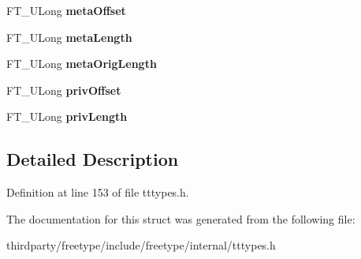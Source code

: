 \begin{DoxyCompactItemize}
\item 
\mbox{\label{struct_w_o_f_f___header_rec___ac93e010ba26ba188d948009c089a824d}} 
F\+T\+\_\+\+U\+Long {\bfseries meta\+Offset}
\item 
\mbox{\label{struct_w_o_f_f___header_rec___a5496776da0752cb2ff133c5068ceb0ab}} 
F\+T\+\_\+\+U\+Long {\bfseries meta\+Length}
\item 
\mbox{\label{struct_w_o_f_f___header_rec___a71ba111d9a0b7139db466f69dc47647f}} 
F\+T\+\_\+\+U\+Long {\bfseries meta\+Orig\+Length}
\item 
\mbox{\label{struct_w_o_f_f___header_rec___a28e0df8dd3d47a13bae3c339c438a0d8}} 
F\+T\+\_\+\+U\+Long {\bfseries priv\+Offset}
\item 
\mbox{\label{struct_w_o_f_f___header_rec___a5b2043f2356a61f1e41cfcd564ca5222}} 
F\+T\+\_\+\+U\+Long {\bfseries priv\+Length}
\end{DoxyCompactItemize}


\subsection{Detailed Description}


Definition at line 153 of file tttypes.\+h.



The documentation for this struct was generated from the following file\+:\begin{DoxyCompactItemize}
\item 
thirdparty/freetype/include/freetype/internal/tttypes.\+h\end{DoxyCompactItemize}
